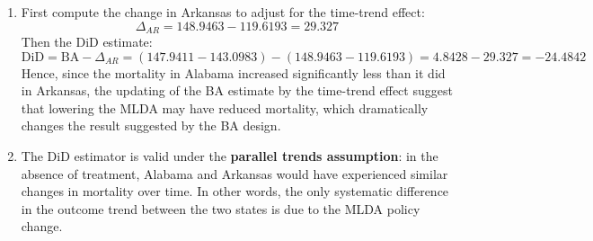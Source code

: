 \documentclass[11pt]{exam}
\begin{document}
\begin{questions}
\begin{solution}
\begin{enumerate}[label=(\alph*)]
    \item First compute the change in Arkansas to adjust for the time-trend effect:
    $$
    \Delta_{AR} = 148.9463 - 119.6193 = 29.327
    $$
    Then the DiD estimate:
    $$
    \text{DiD} = \text{BA} - \Delta_{AR} = (147.9411 - 143.0983) - (148.9463 - 119.6193) = 4.8428 - 29.327 = \boxed{-24.4842}
    $$
    Hence, since the mortality in Alabama increased significantly less than it did in Arkansas, the updating of the BA estimate by the time-trend effect suggest that lowering the MLDA may have reduced mortality, which dramatically changes the result suggested by the BA design.

    \item The DiD estimator is valid under the \textbf{parallel trends assumption}: in the absence of treatment, Alabama and Arkansas would have experienced similar changes in mortality over time. In other words, the only systematic difference in the outcome trend between the two states is due to the MLDA policy change.

\end{enumerate}

\end{solution}

\end{questions}
\end{document}
